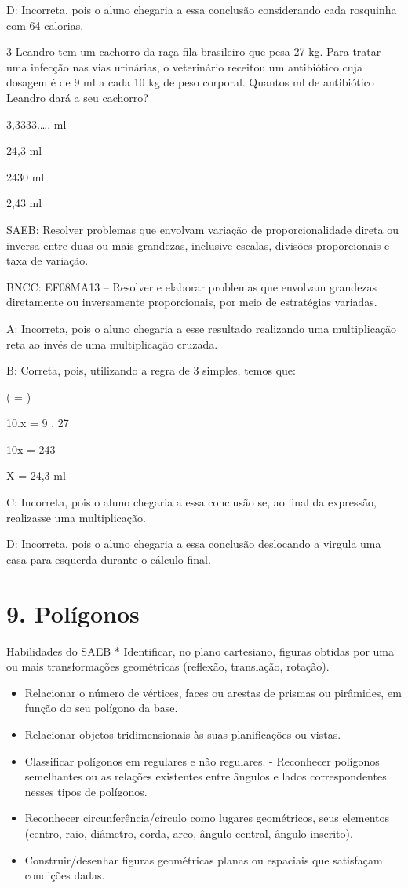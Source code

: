 {D: Incorreta, pois o aluno chegaria a essa conclusão considerando cada
rosquinha com 64 calorias.

\num{3} Leandro tem um cachorro da raça fila brasileiro que pesa 27 kg. Para
tratar uma infecção nas vias urinárias, o veterinário receitou um
antibiótico cuja dosagem é de 9 ml a cada 10 kg de peso corporal.
Quantos ml de antibiótico Leandro dará a seu cachorro?
\item 3,3333.\ldots. ml
\item 24,3 ml
\item 2430 ml
\item 2,43 ml

SAEB: Resolver problemas que envolvam variação de proporcionalidade
direta ou inversa entre duas ou mais grandezas, inclusive escalas,
divisões proporcionais e taxa de variação.

BNCC: EF08MA13 -- Resolver e elaborar problemas que envolvam grandezas
diretamente ou inversamente proporcionais, por meio de estratégias
variadas.

A: Incorreta, pois o aluno chegaria a esse resultado realizando uma
multiplicação reta ao invés de uma multiplicação cruzada.

B: Correta, pois, utilizando a regra de 3 simples, temos que:

( = )

10.x = 9 . 27

10x = 243

X = 24,3 ml

C: Incorreta, pois o aluno chegaria a essa conclusão se, ao final da
expressão, realizasse uma multiplicação.

D: Incorreta, pois o aluno chegaria a essa conclusão deslocando a
virgula uma casa para esquerda durante o cálculo final.


\section{9. Polígonos}

Habilidades do SAEB * Identificar, no plano cartesiano, figuras obtidas
por uma ou mais transformações geométricas (reflexão, translação,
rotação).

\begin{itemize}
\item
  Relacionar o número de vértices, faces ou arestas de prismas ou
  pirâmides, em função do seu polígono da base.
\item
  Relacionar objetos tridimensionais às suas planificações ou vistas.
\item
  Classificar polígonos em regulares e não regulares. - Reconhecer
  polígonos semelhantes ou as relações existentes entre ângulos e lados
  correspondentes nesses tipos de polígonos.
\item
  Reconhecer circunferência/círculo como lugares geométricos, seus
  elementos (centro, raio, diâmetro, corda, arco, ângulo central, ângulo
  inscrito).
\item
  Construir/desenhar figuras geométricas planas ou espaciais que
  satisfaçam condições dadas.
\end{itemize}

}
